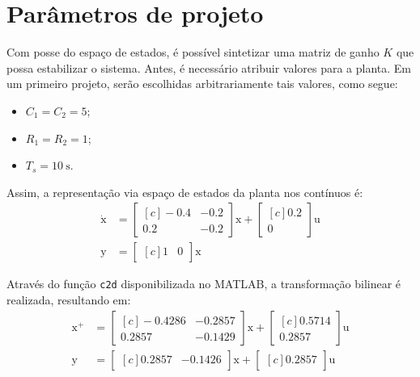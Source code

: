 \section{Parâmetros de projeto}
Com posse do espaço de estados, é possível sintetizar uma matriz de ganho $K$ que possa estabilizar o sistema. Antes, é necessário atribuir valores para a planta. Em um primeiro projeto, serão escolhidas arbitrariamente tais valores, como segue:
\begin{itemize}
  \item $C_1 = C_2 = 5$;
  \item $R_1 = R_2 = 1$;
  \item $T_s = \SI{10}{\second}$.
\end{itemize}

Assim, a representação via espaço de estados da planta nos contínuos é:
\begin{subequations}
  \begin{align}
    \dot{\pmb{\mathrm{x}}} &= \begin{bmatrix*}[c]
      -0.4 & -0.2\\
      0.2 & -0.2
    \end{bmatrix*}\pmb{\mathrm{x}} + \begin{bmatrix*}[c]
      0.2\\
      0
    \end{bmatrix*}\pmb{\mathrm{u}}\label{eq:SSCTCEntrada}\\
    \pmb{\mathrm{y}} &= \begin{bmatrix*}[c]
      1 & 0
    \end{bmatrix*}\pmb{\mathrm{x}}\label{eq:SSCTCSaida}
  \end{align}
\end{subequations}

Através do função \texttt{c2d} disponibilizada no MATLAB, a transformação bilinear é realizada, resultando em:
\begin{subequations}
  \begin{align}
    \pmb{\mathrm{x^{+}}} &= \begin{bmatrix*}[c]
      -0.4286 & -0.2857\\
      0.2857 & -0.1429
    \end{bmatrix*}\pmb{\mathrm{x}} + \begin{bmatrix*}[c]
      0.5714\\
      0.2857
    \end{bmatrix*}\pmb{\mathrm{u}}\label{eq:SSDTCEntrada}\\
    \pmb{\mathrm{y}} &= \begin{bmatrix*}[c]
      0.2857 & -0.1426
    \end{bmatrix*}\pmb{\mathrm{x}} + \begin{bmatrix*}[c]
      0.2857
    \end{bmatrix*}\pmb{\mathrm{u}}\label{eq:SSDTCSaida}
  \end{align}
\end{subequations}

